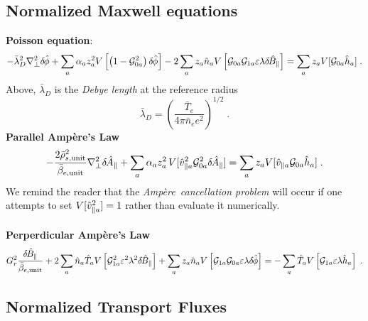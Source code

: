 \subsection{Normalized Maxwell equations}\label{sec.maxwellnorm}

{\bf Poisson equation}:
%
\begin{equation}
-{\bar\lambda}_D^2 \nabla_\perp^2 \delta \hskip -1pt \hat{\phi} + 
\sum_a \alpha_a z_a^2  V \left[ \left(1-{\cal G}_{0a}^2 \right) 
  \delta \hskip -1pt \hat{\phi} \right] 
- 2 \sum_a z_a \hat{n}_a V\left[ {\cal G}_{0a}{\cal G}_{1a} \varepsilon \lambda 
 \delta \hskip -1pt \hat{B}_\parallel \right]
=  \sum_a z_a V[{\cal G}_{0a} \hat{h}_a] \; .
\end{equation}
%
Above, ${\bar\lambda}_D$ is the {\it Debye length} at the reference radius
%
\begin{equation}
{\bar\lambda}_D = \left( \frac{{\bar T}_e}{4\pi {\bar n}_e e^2} \right)^{1/2} 
\; .
\end{equation}
%
{\bf Parallel Amp\`ere's Law}
%
\begin{equation}
-\frac{2\bar{\rho}_{s,{\rm unit}}^2}{\bar{\beta}_{e,{\rm unit}}} \nabla_\perp^2 \delta \hskip -1pt \hat{A}_\parallel + 
\sum_a \alpha_a z_a^2 \, V[\hat{v}_{\parallel a}^2 {\cal G}_{0a}^2 \delta \hskip -1pt \hat{A}_\parallel] = 
 \sum_a z_a V[\hat{v}_{\parallel a} {\cal G}_{0a} \hat{h}_a] \; .
\end{equation}
%
We remind the reader that the {\it Amp\`ere\ cancellation problem} 
\cite{candy:2003} will occur if one attempts to set $V[\hat{v}_{\parallel a}^2]=1$ 
rather than evaluate it numerically.\\
\\
%
{\bf Perperdicular Amp\`ere's Law}
%
\begin{equation}
G_r^2 \frac{\delta \hskip -1pt \hat{B}_\parallel}{\bar{\beta}_{e,{\rm unit}}} 
+ 2 \sum_a \hat{n}_a \hat{T}_a V\left[{\cal G}_{1a}^2 \varepsilon^2 
\lambda^2 \delta \hskip -1pt \hat{B}_\parallel \right]
+ \sum_a z_a \hat{n}_a V \left[ {\cal G}_{1a} {\cal G}_{0a} \varepsilon 
\lambda \delta \hskip -1pt \hat{\phi} \right] 
= - \sum_a \hat{T}_a V\left[ {\cal G}_{1a} \varepsilon \lambda \hat{h}_a \right] \; .
\end{equation}

\subsection{Normalized Transport Fluxes}


